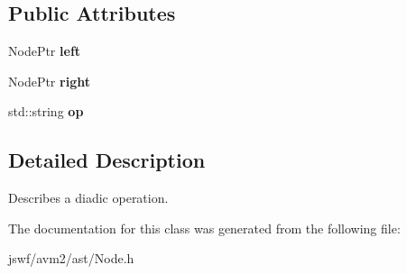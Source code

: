 \subsection*{Public Attributes}
\begin{DoxyCompactItemize}
\item 
\hypertarget{classjswf_1_1avm2_1_1ast_1_1_diadic_node_a2c63a82d584784aa229b6b2675d0fbf3}{Node\+Ptr {\bfseries left}}\label{classjswf_1_1avm2_1_1ast_1_1_diadic_node_a2c63a82d584784aa229b6b2675d0fbf3}

\item 
\hypertarget{classjswf_1_1avm2_1_1ast_1_1_diadic_node_a5fecfc23e6424111988fb2c2f9c2b010}{Node\+Ptr {\bfseries right}}\label{classjswf_1_1avm2_1_1ast_1_1_diadic_node_a5fecfc23e6424111988fb2c2f9c2b010}

\item 
\hypertarget{classjswf_1_1avm2_1_1ast_1_1_diadic_node_a0b715d629e534f2d22e199e8fd98dfa3}{std\+::string {\bfseries op}}\label{classjswf_1_1avm2_1_1ast_1_1_diadic_node_a0b715d629e534f2d22e199e8fd98dfa3}

\end{DoxyCompactItemize}


\subsection{Detailed Description}
Describes a diadic operation. 

The documentation for this class was generated from the following file\+:\begin{DoxyCompactItemize}
\item 
jswf/avm2/ast/Node.\+h\end{DoxyCompactItemize}
